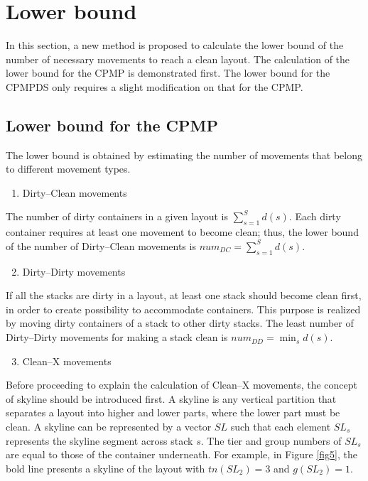 \documentclass[review,3p,times,authoryear,12pt]{elsarticle}
\begin{document}
\section{Lower bound}
\label{sec:cf}

In this section, a new method is proposed to calculate the lower bound of the number of necessary movements to reach a clean layout.
The calculation of the lower bound for the CPMP is demonstrated first.
The lower bound for the CPMPDS only requires a slight modification on that for the CPMP.

\subsection{Lower bound for the CPMP}

The lower bound is obtained by estimating the number of movements that belong to different movement types.

\begin{enumerate}
\setcounter{enumi}{0}
\item Dirty--Clean movements
\end{enumerate}

The number of dirty containers in a given layout is $\sum_{s=1}^S d(s)$.
Each dirty container requires at least one movement to become clean; thus, the lower bound of the number of Dirty--Clean movements is $\mathit{num}_\mathit{DC}=\sum_{s=1}^S d(s)$.

\begin{enumerate}
\setcounter{enumi}{1}
\item Dirty--Dirty movements
\end{enumerate}

If all the stacks are dirty in a layout, at least one stack should become clean first, in order to create possibility to accommodate containers.
This purpose is realized by moving dirty containers of a stack to other dirty stacks.
The least number of Dirty--Dirty movements for making a stack clean is $\mathit{num}_\mathit{DD} = \min_s d(s)$.

\begin{enumerate}
\setcounter{enumi}{2}
\item Clean--X movements
\end{enumerate}

Before proceeding to explain the calculation of Clean--X movements, the concept of skyline should be introduced first.
A skyline is any vertical partition that separates a layout into higher and lower parts, where the lower part must be clean.
A skyline can be represented by a vector $\mathit{SL}$ such that each element $\mathit{SL}_s$ represents the skyline segment across stack $s$.
The tier and group numbers of $\mathit{SL}_s$ are equal to those of the container underneath.
For example, in Figure \ref{fig5}, the bold line presents a skyline of the layout with $\mathit{tn}(\mathit{SL}_{2})=3$ and $g(\mathit{SL}_{2})=1$.
\end{document}
